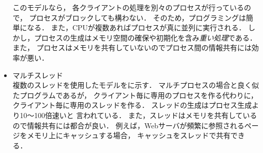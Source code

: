 \begin{itemize}
  このモデルなら，
  各クライアントの処理を別々のプロセスが行っているので，
  プロセスがブロックしても構わない．
  そのため，プログラミングは簡単になる．
  また，CPUが複数あればプロセスが真に並列に実行される．
  しかし，プロセスの生成はメモリ空間の確保や初期化を含み\emph{重い処理}である．
  また，
  プロセスはメモリを共有していないのでプロセス間の情報共有には効率が悪い．

\item マルチスレッド \\
  複数のスレッドを使用したモデルをに示す．
  マルチプロセスの場合と良く似たプログラムであるが，
  クライアント毎に専用のプロセスを作る代わりに，
  クライアント毎に専用のスレッドを作る．
  スレッドの生成はプロセス生成より10〜100倍速いと
  言われている\cite{lightWeight}．
  また，スレッドはメモリを共有しているので情報共有には都合が良い．
  例えば，Webサーバが頻繁に参照されるページをメモリ上にキャッシュする場合，
  キャッシュをスレッドで共有できる．


\end{itemize}
